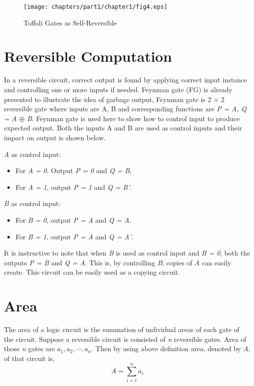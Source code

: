 \begin{figure}[h]
	\centering
	\texttt{[image: chapters/part1/chapter1/fig4.eps]}
	\caption{Toffoli Gates as Self-Reversible}
	\label{fig:p1_c1_fig4}
\end{figure}

\section{Reversible Computation}
In a reversible circuit, correct output is found by applying correct input instance and controlling one or more inputs if needed. Feynman gate (FG) is already presented to illustrate the idea of garbage output, Feynman gate is 2 $\times$ 2 reversible gate where inputs are A, B and corresponding functions are \textit{P = A, Q = A $\oplus$ B}. Feynman gate is used here to show how to control input to produce expected output. Both the inputs A and B are used as control inputs and their impact on output is shown below.

\textit{A} as control input:
	\begin{itemize}
		\item { } For \textit{A = 0}. Output \textit{P = 0 }and \textit{Q = B},
		\item { } For \textit{A = 1}, output \textit{P = 1} and \textit{Q = B'}.
		
	\end{itemize}

\textit{B} as control input:
\begin{itemize}
	\item For \textit{B = 0}, output \textit{P = A} and \textit{Q = A}.
	\item For \textit{B = 1}, output \textit{P = A} and\textit{ Q = A'}.
	
\end{itemize}

It is instructive to note that when \textit{B} is used as control input and \textit{B = 0}, both the outputs \textit{P = B} and \textit{Q = A}. This is, by controlling \textit{B}; copies of \textit{A} can easily create. This circuit can be easily used as a copying circuit.

\section{Area}
The area of a logic circuit is the summation of individual areas of each gate of the circuit. Suppose a reversible circuit is consisted of \textit{n} reversible gates. Area of those \textit{n} gates are $a_1, a_2,\cdots, a_n$. Then by using above definition area, denoted by \textit{A}, of that circuit is,
\begin{equation*}
A=\sum_{i=1}^{n}a_i
\end{equation*}

